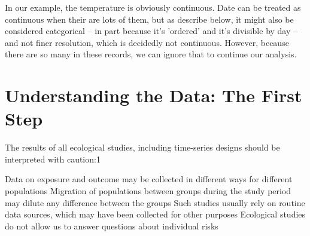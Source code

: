 \documentclass{article}\usepackage[]{graphicx}\usepackage[]{color}
\makeatletter
\newenvironment{kframe}{%
 \def\at@end@of@kframe{}%
 \ifinner\ifhmode%
  \def\at@end@of@kframe{\end{minipage}}%
  \begin{minipage}{\columnwidth}%
 \fi\fi%
 \def\FrameCommand##1{\hskip\@totalleftmargin \hskip-\fboxsep
 \colorbox{shadecolor}{##1}\hskip-\fboxsep
     \hskip-\linewidth \hskip-\@totalleftmargin \hskip\columnwidth}%
 \MakeFramed {\advance\hsize-\width
   \@totalleftmargin\z@ \linewidth\hsize
   \@setminipage}}%
 {\par\unskip\endMakeFramed%
 \at@end@of@kframe}
\newenvironment{knitrout}{}{} %
\makeatother
\begin{document}
\begin{figure}
\begin{center}
\begin{knitrout}
\begin{kframe}
{\ttfamily\noindent\bfseries{}}

{\ttfamily\noindent\bfseries{}}

{\ttfamily\noindent\bfseries{}}

{\ttfamily\noindent\bfseries{}}

{\ttfamily\noindent\bfseries{}}

{\ttfamily\noindent\bfseries{}}\end{kframe}
\end{knitrout}

\end{center}
\end{figure}





In our example, the temperature is obviously continuous. Date can be treated as continuous when their are lots of them, but as describe below, it might also be considered categorical -- in part because it's 'ordered' and it's divisible by day -- and not finer resolution, which is decidedly not continuous. However, because there are so many in these records, we can ignore that to continue our analysis. 



\section{Understanding the Data: The First Step}


The results of all ecological studies, including time-series designs should be interpreted with caution:1

Data on exposure and outcome may be collected in different ways for different populations
Migration of populations between groups during the study period may dilute any difference between the groups
Such studies usually rely on routine data sources, which may have been collected for other purposes
Ecological studies do not allow us to answer questions about individual risks
\end{document}
